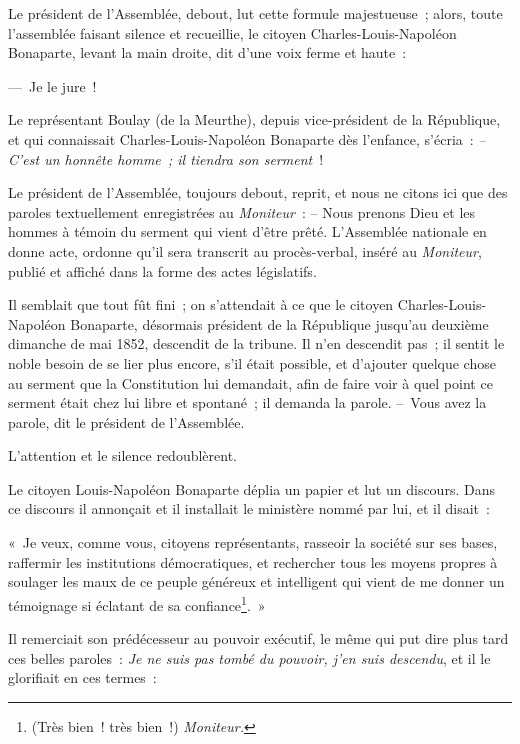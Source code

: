 \documentclass[french,twoside]{book} %
\newenvironment{quoteblock}%
  {\begin{quoting}}
  {\end{quoting}}
\newenvironment{quotebar}{%
    \def\FrameCommand{{\color{rubric!10!}\vrule width 0.5em} \hspace{0.9em}}%
    \def\OuterFrameSep{0pt} %
    \MakeFramed {\advance\hsize-\width \FrameRestore}
  }%
  {%
    \endMakeFramed
  }
\renewenvironment{quoteblock}%
  {%
    \savenotes
    \setstretch{0.9}
    \begin{quotebar}
    \smallskip
  }
  {%
    \smallskip
    \end{quotebar}
    \spewnotes
  }
\begin{document}
\noindent Le président de l’Assemblée, debout, lut cette formule majestueuse ; alors, toute l’assemblée faisant silence et recueillie, le citoyen Charles-Louis-Napoléon Bonaparte, levant la main droite, dit d’une voix ferme et haute :\par
— Je le jure !\par
Le représentant Boulay (de la Meurthe), depuis vice-président de la République, et qui connaissait Charles-Louis-Napoléon Bonaparte dès l’enfance, s’écria : \emph{– C’est un honnête homme ; il tiendra son serment} !\par
Le président de l’Assemblée, toujours debout, reprit, et nous ne citons ici que des paroles textuellement enregistrées au \emph{Moniteur} : – Nous prenons Dieu et les hommes à témoin du serment qui vient d’être prêté. L’Assemblée nationale en donne acte, ordonne qu’il sera transcrit au procès-verbal, inséré au \emph{Moniteur}, publié et affiché dans la forme des actes législatifs.\par
Il semblait que tout fût fini ; on s’attendait à ce que le citoyen Charles-Louis-Napoléon Bonaparte, désormais président de la République jusqu’au deuxième dimanche de mai 1852, descendit de la tribune. Il n’en descendit pas ; il sentit le noble besoin de se lier plus encore, s’il était possible, et d’ajouter quelque chose au serment que la Constitution lui demandait, afin de faire voir à quel point ce serment était chez lui libre et spontané ; il demanda la parole. – Vous avez la parole, dit le président de l’Assemblée.\par
L’attention et le silence redoublèrent.\par
Le citoyen Louis-Napoléon Bonaparte déplia un papier et lut un discours. Dans ce discours il annonçait et il installait le ministère nommé par lui, et il disait :\par

\begin{quoteblock}
 \noindent « Je veux, comme vous, citoyens représentants, rasseoir la société sur ses bases, raffermir les institutions démocratiques, et rechercher tous les moyens propres à soulager les maux de ce peuple généreux et intelligent qui vient de me donner un témoignage si éclatant de sa confiance\footnote{(Très bien ! très bien !) \emph{Moniteur.}}. »
 \end{quoteblock}

\noindent Il remerciait son prédécesseur au pouvoir exécutif, le même qui put dire plus tard ces belles paroles : \emph{Je ne suis pas tombé du pouvoir, j’en suis descendu}, et il le glorifiait en ces termes :\par
\end{document}
